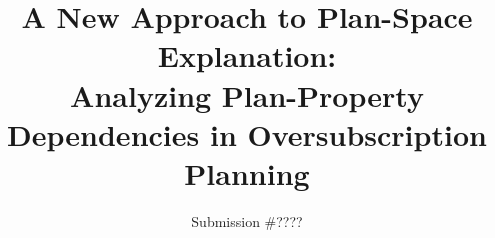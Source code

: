 \documentclass{article}
\begin{document}
\title{A New Approach to Plan-Space Explanation:\\ Analyzing Plan-Property Dependencies in Oversubscription Planning}

\author{Submission \#????}

%

\maketitle
\end{document}
